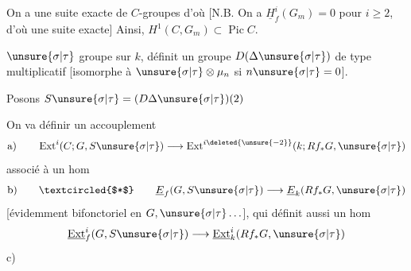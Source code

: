 On a une suite exacte de $C$-groupes
d'où
[N.B. On a $\underline H^i_f(G_m)=0$ pour $i\geq2$,  d'où une suite exacte\unsure{\ldots}]
Ainsi, $H^1(C,G_m)\subset\operatorname{Pic} C$.

$\unsure{\sigma|\tau}$ groupe    sur $k$,
définit un groupe  $D(\Delta\unsure{\sigma|\tau})$ de type multiplicatif [isomorphe à $\unsure{\sigma|\tau}\otimes\mu_n$ si $n\unsure{\sigma|\tau}=0$].

Posons $S\unsure{\sigma|\tau}=(D\Delta\unsure{\sigma|\tau})(2)$

On va définir un  accouplement
\[
\text{a)}\qquad \operatorname{Ext}^i(C;G,S\unsure{\sigma|\tau})\longrightarrow
\operatorname{Ext}^{i\deleted{\unsure{-2}}}(k;Rf_*G,\unsure{\sigma|\tau})
\]
associé à un hom
\[
\text{b)}\qquad \textcircled{$*$}\qquad
\underline E_f(G,S\unsure{\sigma|\tau})\longrightarrow\underline E_k(Rf_*G,\unsure{\sigma|\tau})
\]
[évidemment bifonctoriel en $G,\unsure{\sigma|\tau}\ldots$], qui définit aussi un hom
\[
\underline{\operatorname{Ext}}^i_f(G,S\unsure{\sigma|\tau})\longrightarrow
\underline{\operatorname{Ext}}^i_k(Rf_*G,\unsure{\sigma|\tau})
\]
c)

